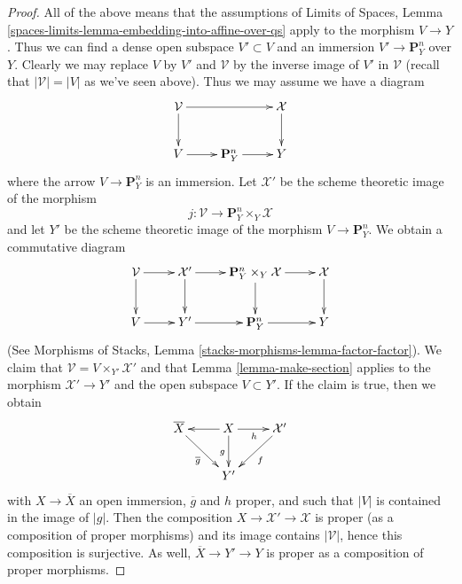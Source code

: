 \begin{proof}
\medskip\noindent
All of the above means that the assumptions of
Limits of Spaces, Lemma \ref{spaces-limits-lemma-embedding-into-affine-over-qs}
apply to the morphism $V \to Y$. Thus we can find a dense open
subspace $V' \subset V$ and an immersion $V' \to \mathbf{P}^n_Y$
over $Y$. Clearly we may replace $V$ by $V'$ and $\mathcal{V}$
by the inverse image of $V'$ in $\mathcal{V}$ (recall that
$|\mathcal{V}| = |V|$ as we've seen above).
Thus we may assume we have a diagram
$$
\xymatrix{
\mathcal{V} \ar[rr] \ar[d] & & \mathcal{X} \ar[d] \\
V \ar[r] & \mathbf{P}^n_Y \ar[r] & Y
}
$$
where the arrow $V \to \mathbf{P}^n_Y$ is an immersion.
Let $\mathcal{X}'$ be the scheme theoretic image of the morphism
$$
j : \mathcal{V} \longrightarrow \mathbf{P}^n_Y \times_Y \mathcal{X}
$$
and let $Y'$ be the scheme theoretic image of the morphism
$V \to \mathbf{P}^n_Y$. We obtain a commutative diagram
$$
\xymatrix{
\mathcal{V} \ar[r] \ar[d] &
\mathcal{X}' \ar[r] \ar[d] &
\mathbf{P}^n_Y \times_Y \mathcal{X} \ar[d] \ar[r] &
\mathcal{X} \ar[d] \\
V \ar[r] &
Y' \ar[r] &
\mathbf{P}^n_Y \ar[r] &
Y
}
$$
(See Morphisms of Stacks, Lemma \ref{stacks-morphisms-lemma-factor-factor}).
We claim that $\mathcal{V} = V \times_{Y'} \mathcal{X}'$ and that
Lemma \ref{lemma-make-section} applies to the morphism $\mathcal{X}' \to Y'$
and the open subspace $V \subset Y'$. If the claim is true, then we obtain
$$
\xymatrix{
\overline{X} \ar[rd]_{\overline{g}} &
X \ar[l] \ar[d]_g \ar[r]_h & \mathcal{X}' \ar[ld]^f \\
& Y'
}
$$
with $X \to \overline{X}$ an open immersion, $\overline{g}$ and $h$ proper,
and such that $|V|$ is contained in the image of $|g|$.
Then the composition $X \to \mathcal{X}' \to \mathcal{X}$ is
proper (as a composition of proper morphisms) and its image
contains $|\mathcal{V}|$, hence this composition is surjective.
As well, $\overline{X} \to Y' \to Y$ is proper as a composition
of proper morphisms.


\end{proof}
